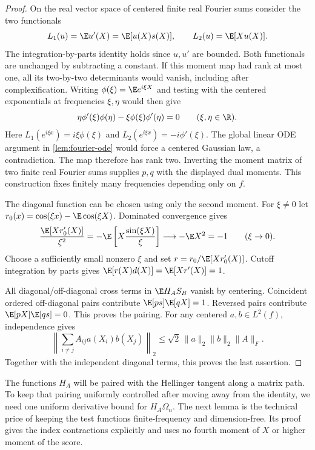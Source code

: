 \begin{proof}
On the real vector space of centered finite real Fourier sums
consider the two functionals
\[
 L_1(u)=\E u'(X)=\E[u(X)s(X)],
 \qquad L_2(u)=\E[Xu(X)].
\]
The integration-by-parts identity holds since $u,u'$ are bounded.
Both functionals are unchanged by subtracting a constant.  If this
moment map had rank at most one, all its two-by-two determinants
would vanish, including after complexification.  Writing
$\phi(\xi)=\E e^{i\xi X}$ and testing with the centered
exponentials at frequencies $\xi,\eta$ would then give
\[
 \eta\phi'(\xi)\phi(\eta)
       -\xi\phi(\xi)\phi'(\eta)=0
 \qquad(\xi,\eta\in\R).
\]
Here $L_1(e^{i\xi x})=i\xi\phi(\xi)$ and
$L_2(e^{i\xi x})=-i\phi'(\xi)$.  The global linear ODE
argument in \cref{lem:fourier-ode} would force a centered
Gaussian law, a contradiction.  The map therefore has rank two.
Inverting the moment matrix of two finite real Fourier sums
supplies $p,q$ with the displayed dual
moments.  This construction fixes finitely many frequencies
depending only on $f$.

The diagonal function can be chosen using only the second moment.
For $\xi\ne0$ let
$r_0(x)=\cos(\xi x)-\E\cos(\xi X)$.  Dominated convergence
gives
\[
 \frac{\E[Xr_0'(X)]}{\xi^2}
 =-\E\left[X\frac{\sin(\xi X)}\xi\right]
 \longrightarrow-\E X^2=-1
 \qquad(\xi\to0).
\]
Choose a sufficiently small nonzero $\xi$ and set
$r=r_0/\E[Xr_0'(X)]$.  Cutoff integration by parts gives
$\E[r(X)d(X)]=\E[Xr'(X)]=1$.

All diagonal/off-diagonal cross terms in $\E H_AS_B$ vanish
by centering.  Coincident ordered off-diagonal pairs contribute
$\E[ps]\E[qX]=1$.
Reversed pairs contribute $\E[pX]\E[qs]=0$.
This proves the pairing.
For any centered $a,b\in L^2(f)$, independence gives
\begin{equation}
 \left\|\sum_{i\ne j}A_{ij}a(X_i)b(X_j)\right\|_2
 \le\sqrt2\,\|a\|_2\|b\|_2\|A\|_F.
 \label{eq:quadratic-chaos-bound}
\end{equation}
Together with the independent diagonal terms, this proves the last
assertion.
\end{proof}

The functions \(H_A\) will be paired with the Hellinger tangent along a
matrix path.
To keep that pairing uniformly controlled after moving away from the identity, we need one
uniform derivative bound for \(H_A\Omega_n\).
The next lemma is the technical price of keeping the test functions
finite-frequency and dimension-free.
Its proof gives the index contractions explicitly and uses no fourth moment
of \(X\) or higher moment of the score.

